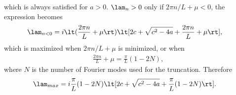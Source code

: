 \documentclass[a4paper,10pt]{article}
\begin{document}
which is always satisfied for $a>0$. $\lam_n>0$ only if $2\pi n/L+\mu<0$, the
expression becomes
\begin{align}
  \lam_{n<0} &= i \lt(\frac{2\pi n}{L}+\mu\rt)\lt[2c + \sqrt{c^2-4a} +
  \frac{2\pi n}L + \mu\rt],
\end{align}
which is maximized when $2\pi n/L+\mu$ is minimized, or when 
\begin{align}
  \frac{2\pi n}{L}+\mu = \frac{\pi}{L}(1-2N),
\end{align}
where $N$ is the number of Fourier modes used for the truncation. Therefore
\begin{align}
  \lam_{max} &=  i \frac{\pi}{L}(1-2N)\lt[ 2c + \sqrt{c^2-4a} + \frac\pi
  L(1-2N)\rt].
\end{align}






{\footnotesize

}
\end{document}
